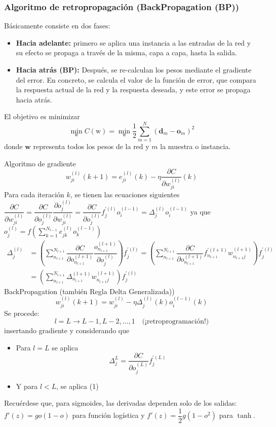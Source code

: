 \subsubsection{Algoritmo de retropropagación (BackPropagation (BP))}
Básicamente consiste en dos fases:
\begin{itemize}
	\item \textbf{Hacia adelante:} primero se aplica una instancia a las entradas de la red y su efecto se propaga a través de la misma, capa a capa, hasta la salida.
	\item \textbf{Hacia atrás (BP):} Después, se re-calculan los pesos mediante el gradiente del error. En concreto, se calcula el valor de la función de error, que compara la respuesta actual de la red y la respuesta deseada, y este error se propaga hacia atrás.
\end{itemize}
El objetivo es minimizar \[ \min_{\mathrm{w}}C(\mathrm{w})=\min_{\mathrm{w}}\dfrac{1}{2}\sum_{m=1}^{N}(\mathbf{d}_m-\mathbf{o}_m)^2 \] donde $\mathbf{w}$ representa todos los pesos de la red y $m$ la muestra o instancia.

Algoritmo de gradiente \[ w_{ji}^{(l)}(k+1)=e_{ji}^{(l)}(k)-\eta\dfrac{\partial C}{\partial w_{ji}^{(l)}}(k) \]
Para cada iteración $k$, se tienen las ecuaciones siguientes $\dfrac{\partial C}{\partial w_{ji}^{(l)}}=\dfrac{\partial C}{\partial o_j^{(l)}}\dfrac{\partial o_j^{(l)}}{\partial w_{ji}^{(l)}}=\dfrac{\partial C}{\partial o_j^{(l)}}f_j^{\prime(l)}o_i^{(l-1)}=\Delta_j^{(l)}o_i^{(l-1)}$ ya que \linebreak $o_j^{(l)}=f\left(\sum_{k=1}^{N_{l-1}}e_{jk}^{(l)}o_k^{(l-1)}\right)$
\begin{equation}
	\begin{split}
	\Delta_j^{(l)}&=\left(\sum_{n_{l+1}}^{N_{l+1}}\dfrac{\partial C}{\partial o_{n_{l+1}}^{(l+1)}}\dfrac{o_{n_{l+1}}^{(l+1)}}{\partial o_j^{(l)}}\right)f_j^{\prime(l)}=\left(\sum_{n_{l+1}}^{N_{l+1}}\dfrac{\partial C}{\partial o_{n_{l+1}}^{(l+1)}}f_{n_{l+1}}^{\prime(l+1)}w_{n_{l+1}j}^{(l+1)}\right)f_j^{\prime(l)}\\
	&=\left(\sum_{n_{l+1}}^{N_{l+1}}\Delta_{n_{l+1}}^{(l+1)}w_{n_{l+1}j}^{(l+1)}\right)f_j^{\prime(l)}
\end{split}
\end{equation}
BackPropagation (también Regla Delta Generalizada)) \[ w_{ji}^{(l)}(k+1)=w_{ji}^{(l)}-\eta\Delta_j^{(l)}(k)o_i^{(l-1)}(k) \]
Se procede: \[ l=L\longrightarrow L-1,L-2,\dots,1\quad\text{(¡retroprogramación!)} \] insertando gradiente y considerando que
\begin{itemize}
	\item Para $l=L$ se aplica \[ \Delta_j^L=\dfrac{\partial C}{\partial o_j^{(L)}}f_j^{\prime (L)} \]
	\item Y para $l<L$, se aplica (1)
\end{itemize}
Recuérdese que, para sigmoides, las derivadas dependen solo de los salidas: $f'(z)=go(1-o)$ para función logística y $f'(z)=\dfrac{1}{2}g(1-o^2)$ para $\tanh$.
